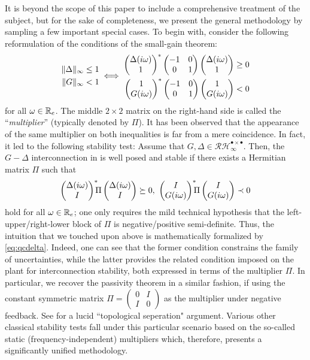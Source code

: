 It is beyond the scope of this paper to include a comprehensive treatment of the subject, but for the 
sake of completeness, we present the general methodology by sampling a few important special cases. 
To begin with, consider the following reformulation of the conditions of the small-gain theorem:
\begin{equation}
\begin{aligned}
\|\Delta\|_\infty &\leq 1\\
\|G\|_\infty &< 1
\end{aligned} \iff
{\scriptstyle \begin{aligned}
\begin{pmatrix}\Delta(i\omega)\\1\end{pmatrix}^*\begin{pmatrix}-1 &0\\0 &1\end{pmatrix}\begin{pmatrix}\Delta(i\omega)\\1\end{pmatrix} &\geq 0\\
\begin{pmatrix}1\\G(i\omega)\end{pmatrix}^*\begin{pmatrix}-1 &0\\0 &1\end{pmatrix}\begin{pmatrix}1\\G(i\omega)\end{pmatrix} &< 0
\end{aligned}}
\label{eq:smqf}
\end{equation}
for all $\omega\in\mathbb{R}_e$. The middle {$2\times2$ matrix} on the right-hand side is called the 
``\emph{multiplier}'' (typically denoted by $\Pi$). It has been observed that the appearance of the 
same multiplier on both inequalities is far from a mere coincidence. In fact, it led to the following 
stability test: Assume that $G,\Delta\in \mathcal{RH}^{\bullet \times \bullet}_\infty$. Then, the 
$G-\Delta$ interconnection {in } is well posed and stable if there exists a 
Hermitian matrix $\Pi$ such that
\begin{equation}
\begin{pmatrix}\Delta(i\omega)\\I\end{pmatrix}^*\!\!\!\Pi\begin{pmatrix}\Delta(i\omega)\\I\end{pmatrix} \succeq 0,\
\begin{pmatrix}I\\G(i\omega)\end{pmatrix}^*\!\!\!\Pi\begin{pmatrix}I\\G(i\omega)\end{pmatrix} \prec 0  \label{eq:qcdelta}
\end{equation}
hold for all $\omega\in\mathbb{R}_e$; one only requires the mild technical hypothesis that the left-upper/right-lower 
block of $\Pi$ is negative/positive semi-definite. Thus, the intuition that we touched upon above is mathematically 
formalized by \eqref{eq:qcdelta}. Indeed, one can see that the former condition constrains the family of uncertainties,
 while the latter {provides the related condition} imposed on the plant for interconnection stability, both expressed 
in terms of the multiplier $\Pi$. In particular, we recover the passivity theorem in a similar fashion, if {using} 
the constant symmetric matrix $\Pi=\left(\begin{smallmatrix}0 &I \\ I &0 \end{smallmatrix} \right)$ as the multiplier 
under negative feedback. See \cite{safonov} for a lucid ``topological seperation" argument. Various other classical 
stability tests fall under this particular {scenario based on the so-called static (frequency-independent) multipliers 
which, therefore, presents} a significantly unified methodology.

